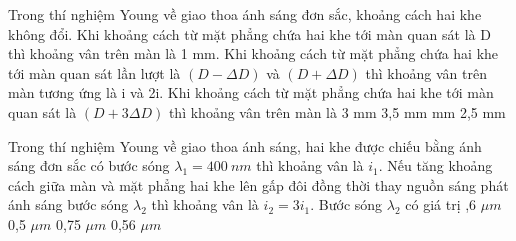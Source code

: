 \begin{vidu}%
 Trong thí nghiệm Young về giao thoa ánh sáng đơn sắc, khoảng cách hai khe không đổi. Khi khoảng cách từ mặt phẳng chứa hai khe tới màn quan sát là D thì khoảng vân trên màn là 1 mm. Khi khoảng cách từ mặt phẳng chứa hai khe tới màn quan sát lần lượt là $(D -\Delta D)$ và $(D +\Delta D)$ thì khoảng vân trên màn tương ứng là i và 2i. Khi khoảng cách từ mặt phẳng chứa hai khe tới màn quan sát là $(D + 3\Delta D)$ thì khoảng vân trên màn là
\choice
{3 mm}
{3,5 mm}
{ mm}
{2,5 mm}
\end{vidu} 
\begin{vidu}%
Trong thí nghiệm Young về giao thoa ánh sáng, hai khe được chiếu bằng ánh sáng đơn sắc có bước sóng ${{\lambda}_{1}}=400\ nm $ thì khoảng vân là ${i_1} $. Nếu tăng khoảng cách giữa màn và mặt phẳng hai khe lên gấp đôi đồng thời thay nguồn sáng phát ánh sáng bước sóng ${{\lambda}_{2}} $ thì khoảng vân là ${i_2}=3{i_1} $. Bước sóng ${{\lambda}_{2}} $ có giá trị
\choice
{,6 $\mu m $}
{0,5 $\mu m $}
{0,75 $\mu m $}
{0,56 $\mu m $}
\end{vidu} 

